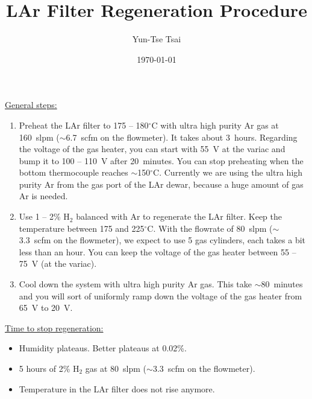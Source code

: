 \documentclass[letterpaper,11pt]{article}
\newcommand{\Hydro}     {H$_2$}
\newcommand{\dC}        {$^\circ$C}
\begin{document}
\title{\textbf{LAr Filter Regeneration Procedure}}
\author{Yun-Tse Tsai}
\date{\today}

\maketitle

\underline{General steps:}
\begin{enumerate}
\setlength\itemsep{-0.2em}
\item Preheat the LAr filter to 175 -- 180{\dC} with ultra high purity Ar gas at 160~slpm ($\sim$6.7~scfm on the flowmeter).  
It takes about 3~hours.  Regarding the voltage of the gas heater, you can start with 55~V at the variac and bump it 
to 100 -- 110~V after 20~minutes.  
You can stop preheating when the bottom thermocouple reaches $\sim$150{\dC}.
Currently we are using the ultra high purity Ar from the gas port of the LAr dewar, because a huge amount of gas Ar
is needed.
\item Use 1 -- 2\% {\Hydro} balanced with Ar to regenerate the LAr filter.  Keep the temperature between 175 and 225{\dC}.  
With the flowrate of 80~slpm ($\sim$3.3~scfm on the flowmeter), we expect to use 5 gas cylinders, 
each takes a bit less than an hour.  You can keep the voltage of the gas heater between 55 -- 75~V (at the variac).
\item Cool down the system with ultra high purity Ar gas.  
This take $\sim$80~minutes and you will sort of uniformly ramp down the voltage of the gas heater from 65~V to 20~V.
\end{enumerate}

\underline{Time to stop regeneration:}
\begin{itemize}
\setlength\itemsep{-0.2em}
\item Humidity plateaus.  Better plateaus at 0.02\%.
\item 5 hours of 2\% {\Hydro} gas at 80~slpm ($\sim$3.3~scfm on the flowmeter).
\item Temperature in the LAr filter does not rise anymore.
\end{itemize}
\end{document}
